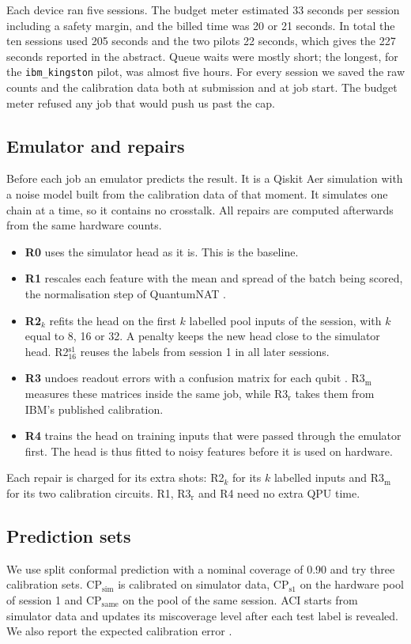 \documentclass[10pt,conference]{IEEEtran}
\begin{document}
Each device ran five sessions. The budget meter estimated 33 seconds per session including a
safety margin, and the billed time was 20 or 21 seconds. In total the ten sessions used 205 seconds
and the two pilots 22 seconds, which gives the 227 seconds reported in the abstract. Queue waits
were mostly short; the longest, for the \texttt{ibm\_kingston} pilot, was almost five hours. For every session we saved the raw counts
and the calibration data both at submission and at job start. The budget meter refused
any job that would push us past the cap.

\subsection{Emulator and repairs}
Before each job an emulator predicts the result. It is a Qiskit Aer simulation with a noise model
built from the calibration data of that moment. It simulates one chain at a time, so it contains no crosstalk. All repairs are computed afterwards from the same hardware counts.
\begin{itemize}
\item \textbf{R0} uses the simulator head as it is. This is the baseline.
\item \textbf{R1} rescales each feature with the mean and spread of the batch being scored, the
normalisation step of QuantumNAT \cite{wang2022quantumnat}.
\item \textbf{R2$_k$} refits the head on the first $k$ labelled pool inputs of the session, with
$k$ equal to 8, 16 or 32. A penalty keeps the new head close to the simulator head.
R2$_{16}^{\mathrm{s1}}$ reuses the labels from session 1 in all later sessions.
\item \textbf{R3} undoes readout errors with a confusion matrix for each qubit
\cite{nation2021m3}. R3$_\mathrm{m}$ measures these matrices inside the same job, while
R3$_\mathrm{r}$ takes them from IBM's published calibration.
\item \textbf{R4} trains the head on training inputs that were passed through the emulator first.
The head is thus fitted to noisy features before it is used on hardware.
\end{itemize}
Each repair is charged for its extra shots: R2$_k$ for its $k$ labelled inputs and R3$_\mathrm{m}$
for its two calibration circuits. R1, R3$_\mathrm{r}$ and R4 need no extra QPU time.

\subsection{Prediction sets}
We use split conformal prediction with a nominal coverage of 0.90 \cite{park2023qcp} and try three
calibration sets. CP$_\mathrm{sim}$ is calibrated on simulator data, CP$_\mathrm{s1}$ on the
hardware pool of session 1 and CP$_\mathrm{same}$ on the pool of the same session. ACI
\cite{gibbs2021aci} starts from simulator data and updates its miscoverage level after each test label is revealed. We also report the expected calibration error \cite{guo2017calibration}.
\end{document}

